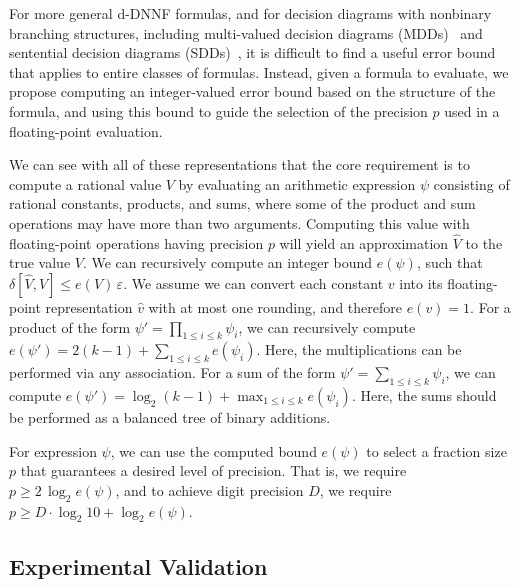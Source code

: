 \documentclass[letterpaper,USenglish,cleveref, autoref, thm-restate]{lipics-v2021}
\newcommand{\approximate}[1]{\hat{#1}}
\newcommand{\approxv}{\approximate{v}}
\newcommand{\approxV}{\approximate{V}}
\newcommand{\aerror}{\delta}
\newcommand{\roundepsilon}{\varepsilon}
\begin{document}
For more general d-DNNF formulas, and for decision diagrams with
nonbinary branching structures, including multi-valued decision
diagrams (MDDs)~\cite{srinivasan:iccad:1990} and sentential decision
diagrams (SDDs)~\cite{darwiche:ijcai:2011}, it is difficult to find a
useful error bound that applies to entire classes of formulas.
Instead, given a formula to evaluate,
we propose computing an integer-valued error bound based on the
structure of the formula, and using this bound to guide the selection of
the precision $p$ used in a floating-point evaluation.

We can see with all of these representations that the core requirement
is to compute a rational value $V$ by evaluating an arithmetic
expression $\psi$ consisting of rational constants, products, and
sums, where some of the product and sum operations may have more than
two arguments.  Computing this value with floating-point operations
having precision $p$ will yield an approximation $\approxV$ to the
true value $V$.  We can recursively compute an integer bound $e(\psi)$, such that
$\aerror[\approxV, V] \leq e(V) \,\roundepsilon$.  We assume we
can convert each constant $v$ into its floating-point representation
$\approxv$ with at most one rounding, and therefore $e(v) = 1$.  For a
product of the form $\psi' = \prod_{1 \leq i \leq k} \psi_i$, we can
recursively compute $e(\psi') = 2(k-1) + \sum_{1 \leq i \leq k}
e(\psi_i)$.  Here, the multiplications can be performed via any
association.
For a sum of the form
$\psi' = \sum_{1 \leq i \leq k} \psi_i$, we can compute
$e(\psi') = \log_2(k-1) + \max_{1\leq i \leq k} e(\psi_i)$.  Here, the sums should be performed as a balanced tree of binary additions.

For expression $\psi$, we can use the computed bound $e(\psi)$ to
select a fraction size $p$ that guarantees a desired level of
precision.  That is, we require $p \geq 2\,\log_2 e(\psi)$, and to
achieve digit precision $D$, we require $p \geq D \cdot \log_2 10 +\log_2 e(\psi)$.

\subsection{Experimental Validation}
\end{document}
